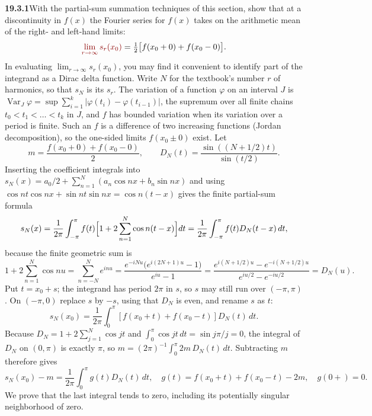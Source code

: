 \par\bigskip
\noindent\textbf{19.3.1}\quad With the partial-sum summation
techniques of this section, show that at a discontinuity in $f(x)$
the Fourier series for $f(x)$ takes on the arithmetic mean of the
right- and left-hand limits:
\[
\erratum{\lim_{r\to\infty}s_r(x_{0})}=\tfrac{1}{2}\big[f(x_{0}+0)+f(x_{0}-0)\big].
\]
In evaluating $\displaystyle\lim_{r\to\infty}s_{r}(x_{0})$, you may
find it convenient to identify part of the integrand as a Dirac
delta function.
\solution
{}
Write $N$ for the textbook's number $r$ of harmonics, so that $s_N$ is
its $s_r$. The variation of a function $\varphi$ on an interval $J$ is
$\operatorname{Var}_J\varphi
=\sup\sum_{i=1}^k|\varphi(t_i)-\varphi(t_{i-1})|$, the supremum over all
finite chains $t_0<t_1<\dots<t_k$ in $J$, and $f$ has bounded variation
when its variation over a period is finite. Such an $f$ is a difference
of two increasing functions (Jordan decomposition), so the one-sided
limits $f(x_0\pm0)$ exist. Let
\[
m=\frac{f(x_0+0)+f(x_0-0)}2,
\qquad D_N(t)=\frac{\sin((N+1/2)t)}{\sin(t/2)}.
\]
Inserting the coefficient integrals into
$s_N(x)=a_0/2+\sum_{n=1}^N(a_n\cos nx+b_n\sin nx)$ and using
$\cos nt\cos nx+\sin nt\sin nx=\cos n(t-x)$ gives the finite
partial-sum formula
\[
s_N(x)=\frac1{2\pi}\int_{-\pi}^{\pi}f(t)
\Bigl[1+2\sum_{n=1}^N\cos n(t-x)\Bigr]dt
=\frac1{2\pi}\int_{-\pi}^{\pi}f(t)D_N(t-x)\,dt,
\]
because the finite geometric sum is
\[
1+2\sum_{n=1}^N\cos nu=\sum_{n=-N}^{N}e^{inu}
=\frac{e^{-iNu}\bigl(e^{i(2N+1)u}-1\bigr)}{e^{iu}-1}
=\frac{e^{i(N+1/2)u}-e^{-i(N+1/2)u}}{e^{iu/2}-e^{-iu/2}}
=D_N(u).
\]
Put $t=x_0+s$; the integrand has period $2\pi$ in $s$, so $s$ may
still run over $(-\pi,\pi)$. On $(-\pi,0)$ replace $s$ by $-s$, using
that $D_N$ is even, and rename $s$ as $t$:
\[
s_N(x_0)=\frac1{2\pi}\int_0^\pi
[f(x_0+t)+f(x_0-t)]D_N(t)\,dt.
\]
Because $D_N=1+2\sum_{j=1}^N\cos jt$ and $\int_0^\pi\cos jt\,dt
=\sin j\pi/j=0$, the integral of $D_N$ on $(0,\pi)$ is exactly $\pi$,
so $m=(2\pi)^{-1}\int_0^\pi2m\,D_N(t)\,dt$. Subtracting $m$ therefore
gives
\[
s_N(x_0)-m=\frac1{2\pi}\int_0^\pi g(t)D_N(t)\,dt,
\quad g(t)=f(x_0+t)+f(x_0-t)-2m,
\quad g(0+)=0.
\]
We prove that the last integral tends to zero, including its potentially
singular neighborhood of zero.

